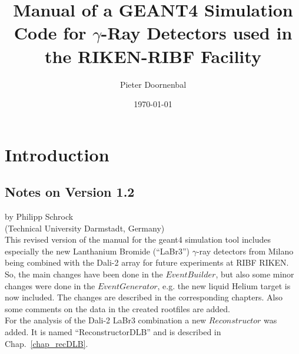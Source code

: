 \documentclass[12pt]{book}
\begin{document}
\pagestyle{headings}

\author[1]{Pieter Doornenbal}
\date{\today} 
\title{Manual of a GEANT4 Simulation Code for $\gamma$-Ray Detectors used
  in the RIKEN-RIBF Facility}

\maketitle
\tableofcontents

\chapter{Introduction}
\sloppy
\section{Notes on Version 1.2}
by Philipp Schrock \\
(Technical University Darmstadt, Germany)\\

This revised version of the manual for the geant4 simulation tool includes especially the new Lanthanium Bromide (``LaBr3'') $\gamma$-ray detectors from Milano being combined with the Dali-2 array for future experiments at RIBF RIKEN. So, the main changes have been done in the $EventBuilder$, but also some minor changes were done in the $EventGenerator$, e.g. the new liquid Helium target is now included. The changes are described in the corresponding chapters. Also some comments on the data in the created rootfiles are added.\\
For the analysis of the Dali-2 LaBr3 combination a new $Reconstructor$ was added. It is named ``ReconstructorDLB'' and is described in Chap.~\ref{chap_recDLB}.
\end{document}

